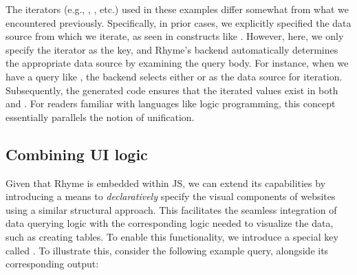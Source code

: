 \documentclass[runningheads]{llncs}
\newcommand{\lang}{Rhyme}
\begin{document}
The iterators (e.g., \inline{*}, , etc.) used in these
examples differ somewhat from what we encountered previously.
Specifically, in prior cases, we explicitly specified the data source from which we iterate,
as seen in constructs like .
However, here, we only specify the iterator as the key, and \lang{}'s backend
automatically determines the appropriate data source by examining the query body.
For instance, when we have a query like , the
backend selects either  or  as the data source for iteration.
Subsequently, the generated code ensures that the iterated values exist in
both  and .
For readers familiar with languages like logic programming, this concept essentially
parallels the notion of unification.




\subsection{Combining UI logic}
Given that \lang{} is embedded within JS, we can extend its capabilities by introducing
a means to \emph{declaratively} specify the visual components of websites using a similar
structural approach.
This facilitates the seamless integration of data querying logic with the corresponding
logic needed to visualize the data, such as creating tables.
To enable this functionality, we introduce a special key called .
To illustrate this, consider the following example query, alongside its corresponding output:
\end{document}
